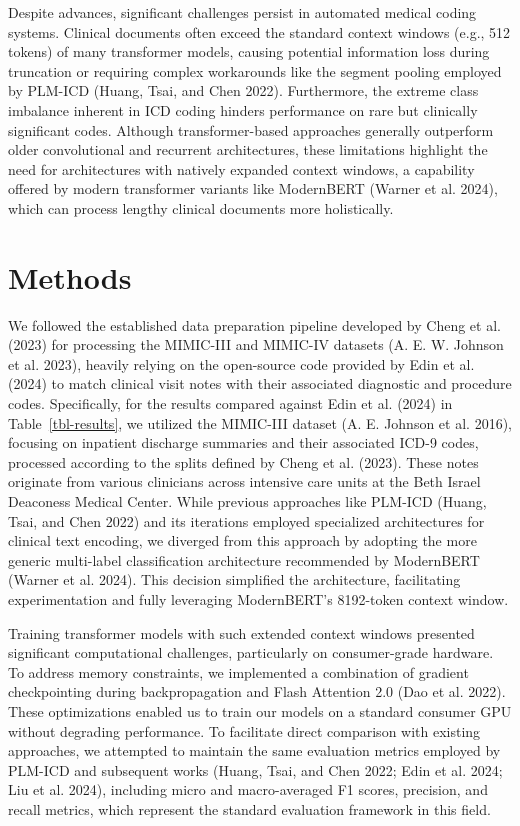 \documentclass[
]{article}
\begin{document}
Despite advances, significant challenges persist in automated medical
coding systems. Clinical documents often exceed the standard context
windows (e.g., 512 tokens) of many transformer models, causing potential
information loss during truncation or requiring complex workarounds like
the segment pooling employed by PLM-ICD (Huang, Tsai, and Chen 2022).
Furthermore, the extreme class imbalance inherent in ICD coding hinders
performance on rare but clinically significant codes. Although
transformer-based approaches generally outperform older convolutional
and recurrent architectures, these limitations highlight the need for
architectures with natively expanded context windows, a capability
offered by modern transformer variants like ModernBERT (Warner et al.
2024), which can process lengthy clinical documents more holistically.

\section{Methods}\label{sec-methods}

We followed the established data preparation pipeline developed by Cheng
et al. (2023) for processing the MIMIC-III and MIMIC-IV datasets (A. E.
W. Johnson et al. 2023), heavily relying on the open-source code
provided by Edin et al. (2024) to match clinical visit notes with their
associated diagnostic and procedure codes. Specifically, for the results
compared against Edin et al. (2024) in Table~\ref{tbl-results}, we
utilized the MIMIC-III dataset (A. E. Johnson et al. 2016), focusing on
inpatient discharge summaries and their associated ICD-9 codes,
processed according to the splits defined by Cheng et al. (2023). These
notes originate from various clinicians across intensive care units at
the Beth Israel Deaconess Medical Center. While previous approaches like
PLM-ICD (Huang, Tsai, and Chen 2022) and its iterations employed
specialized architectures for clinical text encoding, we diverged from
this approach by adopting the more generic multi-label classification
architecture recommended by ModernBERT (Warner et al. 2024). This
decision simplified the architecture, facilitating experimentation and
fully leveraging ModernBERT's 8192-token context window.

Training transformer models with such extended context windows presented
significant computational challenges, particularly on consumer-grade
hardware. To address memory constraints, we implemented a combination of
gradient checkpointing during backpropagation and Flash Attention 2.0
(Dao et al. 2022). These optimizations enabled us to train our models on
a standard consumer GPU without degrading performance. To facilitate
direct comparison with existing approaches, we attempted to maintain the
same evaluation metrics employed by PLM-ICD and subsequent works (Huang,
Tsai, and Chen 2022; Edin et al. 2024; Liu et al. 2024), including micro
and macro-averaged F1 scores, precision, and recall metrics, which
represent the standard evaluation framework in this field.
\end{document}
